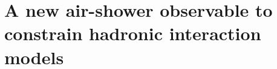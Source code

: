 \chapter[A new air-shower observable to constrain hadronic interaction models]{A new air-shower observable to constrain hadronic interaction models}
\label{sec:observable}



